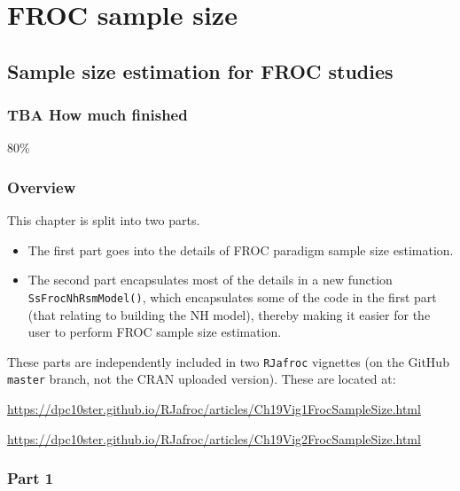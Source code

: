 \documentclass[
]{book}
\begin{document}
\hypertarget{part-froc-sample-size}{%
\part*{FROC sample size}\label{part-froc-sample-size}}

\hypertarget{froc-sample-size}{%
\chapter{Sample size estimation for FROC studies}\label{froc-sample-size}}

\hypertarget{froc-sample-size-how-much-finished}{%
\section{TBA How much finished}\label{froc-sample-size-how-much-finished}}

80\%

\hypertarget{overview}{%
\section{Overview}\label{overview}}

This chapter is split into two parts.

\begin{itemize}
\item
  The first part goes into the details of FROC paradigm sample size estimation.
\item
  The second part encapsulates most of the details in a new function \texttt{SsFrocNhRsmModel()}, which encapsulates some of the code in the first part (that relating to building the NH model), thereby making it easier for the user to perform FROC sample size estimation.
\end{itemize}

These parts are independently included in two \texttt{RJafroc} vignettes (on the GitHub \texttt{master} branch, not the CRAN uploaded version). These are located at:

\url{https://dpc10ster.github.io/RJafroc/articles/Ch19Vig1FrocSampleSize.html}

\url{https://dpc10ster.github.io/RJafroc/articles/Ch19Vig2FrocSampleSize.html}

\hypertarget{part-1}{%
\section{Part 1}\label{part-1}}
\end{document}
